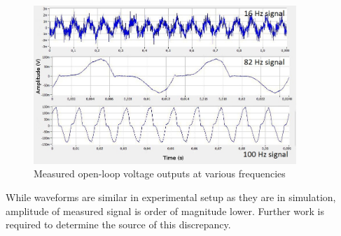 \begin{figure}[h]
\begin{center}
  \includegraphics[height=6cm]{images/own_measurement/lg_proto.jpg}
  \end{center}
  \caption{\label{fiq:lg_proto_results} Measured open-loop voltage outputs at various frequencies}
\end{figure}

While waveforms are similar in experimental setup as they are in simulation, amplitude of measured signal is order of magnitude lower. Further work is required to determine the source of this discrepancy. 
